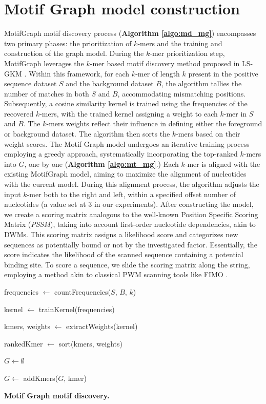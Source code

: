 \documentclass[a4paper, titlepage, openright]{book}
\newcommand{\motifgraph}{MotifGraph\xspace}
\begin{document}
\section{Motif Graph model construction}
\motifgraph motif discovery process (\textbf{Algorithm \ref{algo:md_mg}}) encompasses two primary phases: the prioritization of $k$-mers and the training and construction of the graph model.  During the $k$-mer prioritization step, \motifgraph leverages the $k$-mer based motif discovery method proposed in LS-GKM \citep{ghandi2014enhanced, lee2016ls}. Within this framework, for each $k$-mer of length $k$ present in the positive sequence dataset $S$ and the background dataset $B$,  the algorithm tallies the number of matches in both $S$ and $B$,  accommodating mismatching positions. Subsequently, a cosine similarity kernel is trained using the frequencies of the recovered $k$-mers, with the trained kernel assigning a weight to each $k$-mer in $S$ and $B$. The $k$-mers weights reflect their influence in defining either the foreground or background dataset. The algorithm then sorts the $k$-mers based on their weight scores. The Motif Graph model undergoes an iterative training process employing a greedy approach, systematically incorporating the top-ranked $k$-mers into $G$, one by one (\textbf{Algorithm \ref{algo:mt_mg}}.) Each $k$-mer is aligned with the existing \motifgraph model, aiming to maximize the alignment of nucleotides with the current model. During this alignment process, the algorithm adjusts the input $k$-mer both to the right and left, within a specified offset number of nucleotides (a value set at 3 in our experiments). After constructing the model, we create a scoring matrix analogous to the well-known Position Specific Scoring Matrix (\emph{PSSM}), taking into account first-order nucleotide dependencies, akin to DWMs. This scoring matrix assigns a likelihood score and categorizes new sequences as potentially bound or not by the investigated factor. Essentially, the score indicates the likelihood of the scanned sequence containing a potential binding site. To score a sequence, we slide the scoring matrix along the string, employing a method akin to classical PWM scanning tools like FIMO \citep{grant2011fimo}.
\begin{algorithm}
	\DontPrintSemicolon

	frequencies $\gets$ countFrequencies($S$, $B$, $k$)

	kernel $\gets$ trainKernel(frequencies)

	kmers, weights $\gets$ extractWeights(kernel)

	rankedKmer $\gets$ sort(kmers, weights)

	$G \gets \emptyset$

	{
		$G \gets$ addKmers($G$, kmer)
	}

	\caption{\textbf{Motif Graph motif discovery.}}
	\label{algo:md_mg}
\end{algorithm}
\end{document}
